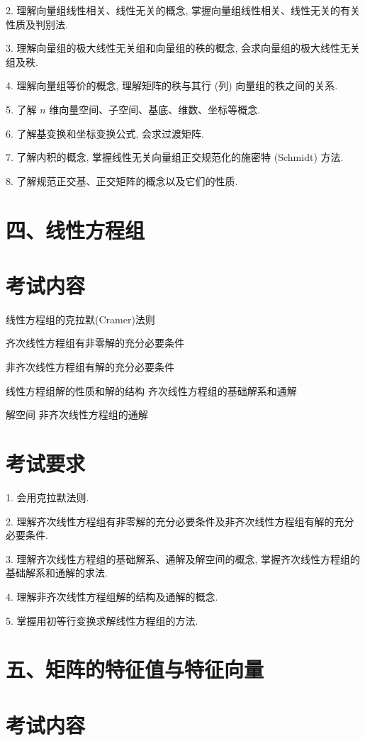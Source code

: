 \documentclass[10pt]{article}
\begin{document}
2. 理解向量组线性相关、线性无关的概念, 掌握向量组线性相关、线性无关的有关性质及判别法.

3. 理解向量组的极大线性无关组和向量组的秩的概念, 会求向量组的极大线性无关组及秩.

4. 理解向量组等价的概念, 理解矩阵的秩与其行 (列) 向量组的秩之间的关系.

5. 了解 \(n\) 维向量空间、子空间、基底、维数、坐标等概念.

6. 了解基变换和坐标变换公式, 会求过渡矩阵.

7. 了解内积的概念, 掌握线性无关向量组正交规范化的施密特 (Schmidt) 方法.

8. 了解规范正交基、正交矩阵的概念以及它们的性质.

\section*{四、线性方程组}

\section*{考试内容}

线性方程组的克拉默(Cramer)法则 

齐次线性方程组有非零解的充分必要条件 

非齐次线性方程组有解的充分必要条件 

线性方程组解的性质和解的结构 齐次线性方程组的基础解系和通解

解空间 非齐次线性方程组的通解

\section*{考试要求}

1. 会用克拉默法则.

2. 理解齐次线性方程组有非零解的充分必要条件及非齐次线性方程组有解的充分必要条件.

3. 理解齐次线性方程组的基础解系、通解及解空间的概念, 掌握齐次线性方程组的基础解系和通解的求法.

4. 理解非齐次线性方程组解的结构及通解的概念.

5. 掌握用初等行变换求解线性方程组的方法.

\section*{五、矩阵的特征值与特征向量}

\section*{考试内容}
\end{document}

